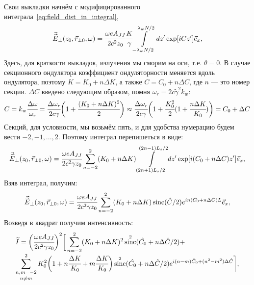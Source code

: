 \documentclass[14pt,a4paper]{extarticle}
\numberwithin{equation}{section}
\DeclareMathOperator{\sinc}{sinc}
\begin{document}
Свои выкладки начнём с модифицированного интеграла~\ref{eq:field_dist_in_integral}, 
\begin{equation}
	\begin{array}{lcl}
	\vec{\widetilde{E}}_{\bot}(z_0,  \vec{r}_{\bot 0}, \omega) =
	\cfrac{\omega eA_{JJ}}{2c^2z_0}\cfrac{K}{\gamma}
	\displaystyle\int\limits_{-\lambda_w N/2}^{\lambda_w N/2} dz'
	\exp[iCz'] 	\vec{e}_x,
	\end{array}	
\end{equation} 
Здесь, для краткости выкладок, излучения мы сморим на оси, т.е. $\theta = 0$. В случае секционного ондулятора коэффициент ондуляторности меняется вдоль ондулятора, поэтому $K = K_0 + n\Delta K$, а также $C = C_0 + n\Delta C$, где $n$ --- это номер секции. $\Delta {C}$ введено следующим образом, помня $\omega_r = 2c\widetilde{\gamma}^2k_w$:
\begin{equation}
	C =k_w\cfrac{\Delta \omega}{\omega_r} = \cfrac{\Delta \omega_r}{2c\gamma}\bigg(1 + \cfrac{(K_0 + n\Delta K)^2}{2}\bigg) \approx \cfrac{\Delta \omega_r}{2c\gamma}\bigg(1 + \cfrac{K^2_0}{2}(1 + \cfrac{n\Delta K}{K_0})\bigg) = C_0 + \Delta C
\end{equation} 
Секций, для условности, мы возьмём пять, и для удобства нумерацию будем вести $-2, -1, ... , 2$. Поэтому интеграл перепишеться в виде:
\begin{equation}
	\begin{array}{lcl}
	\vec{\widetilde{E}}_{\bot}(z_0,  \vec{r}_{\bot 0}, \omega) =
	\cfrac{\omega eA_{JJ}}{2c^2 \gamma z_0}
	\displaystyle\sum\limits_{n =-2}^{2}(K_0 + n\Delta K)
	\displaystyle\int\limits_{(2n + 1)L_s/2}^{(2n - 1)L_s/2} dz'
	\exp[i(C_0 + n\Delta C)z']	\vec{e}_x,
	\end{array}	
\end{equation} 
Взяв интеграл, получим:
\begin{equation}
	\begin{array}{lcl}
	\vec{\widetilde{E}}_{\bot}(z_0,  \vec{r}_{\bot 0}, \omega) =
	\cfrac{\omega eA_{JJ}}{2c^2 \gamma z_0}
	\displaystyle\sum\limits_{n =-2}^{2}(K_0 + n\Delta K)
	\sinc(\hat{C}/2)e^{in({C}_0 + n\Delta {C})L}	\vec{e}_x,
	\end{array}	
\end{equation} 
Возведя в квадрат получим интенсивность:
\begin{equation}
	\begin{array}{lcl}
	{\widetilde{I}} =
	\bigg(\cfrac{\omega eA_{JJ}}{2c^2 \gamma z_0}\bigg)^2\bigg[
	\displaystyle\sum\limits_{n =-2}^{2}(K_0 + n\Delta K)^2\sinc^2(\hat{C_0} + n\Delta \hat{C}/2) + \\
		
	\displaystyle\mathop{\sum\limits_{n, m =-2}^{2}}_{n \neq m}K^2_0\bigg(1 + n\cfrac{\Delta K}{K_0} + m\cfrac{\Delta K}{K_0}\bigg)
	\sinc^2(\hat{C_0} + n\Delta \hat{C}/2)e^{i(n-m)\hat{C}_0 + (n^2 - m^2)\Delta \hat{C}}\bigg],
	\end{array}	
\end{equation} 
\end{document}
